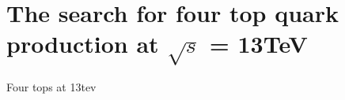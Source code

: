 \chapter{The search for four top quark production at $\sqrt{s}$ = 13TeV \label{c:Run2}}

Four tops at 13tev